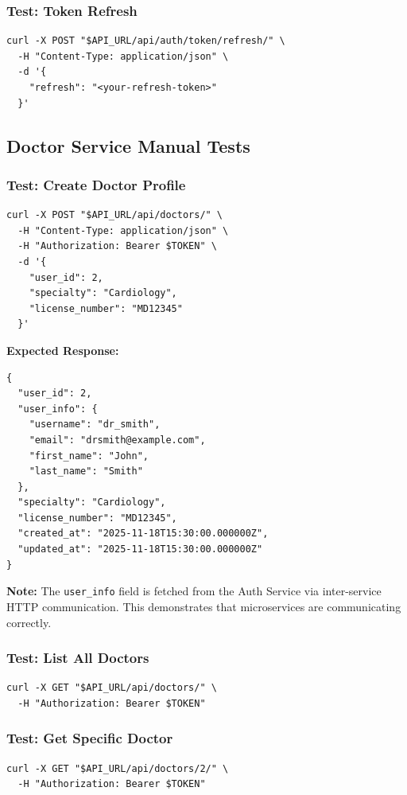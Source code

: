 \documentclass[12pt,a4paper]{article}
\begin{document}
\subsubsection{Test: Token Refresh}
\begin{lstlisting}[style=bash]
curl -X POST "$API_URL/api/auth/token/refresh/" \
  -H "Content-Type: application/json" \
  -d '{
    "refresh": "<your-refresh-token>"
  }'
\end{lstlisting}

\subsection{Doctor Service Manual Tests}

\subsubsection{Test: Create Doctor Profile}
\begin{lstlisting}[style=bash]
curl -X POST "$API_URL/api/doctors/" \
  -H "Content-Type: application/json" \
  -H "Authorization: Bearer $TOKEN" \
  -d '{
    "user_id": 2,
    "specialty": "Cardiology",
    "license_number": "MD12345"
  }'
\end{lstlisting}

\textbf{Expected Response:}
\begin{lstlisting}[style=json]
{
  "user_id": 2,
  "user_info": {
    "username": "dr_smith",
    "email": "drsmith@example.com",
    "first_name": "John",
    "last_name": "Smith"
  },
  "specialty": "Cardiology",
  "license_number": "MD12345",
  "created_at": "2025-11-18T15:30:00.000000Z",
  "updated_at": "2025-11-18T15:30:00.000000Z"
}
\end{lstlisting}

\textbf{Note:} The \texttt{user\_info} field is fetched from the Auth Service via inter-service HTTP communication. This demonstrates that microservices are communicating correctly.

\subsubsection{Test: List All Doctors}
\begin{lstlisting}[style=bash]
curl -X GET "$API_URL/api/doctors/" \
  -H "Authorization: Bearer $TOKEN"
\end{lstlisting}

\subsubsection{Test: Get Specific Doctor}
\begin{lstlisting}[style=bash]
curl -X GET "$API_URL/api/doctors/2/" \
  -H "Authorization: Bearer $TOKEN"
\end{lstlisting}
\end{document}
